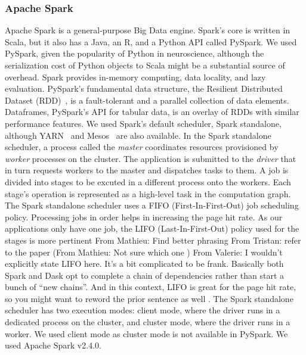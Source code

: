 \documentclass[conference]{IEEEtran}
\newcommand{\TG}[1]{\color{cyan}From Tristan: #1 \color{black}}
\newcommand{\MD}[1]{\color{magenta}From Mathieu: #1 \color{black}}
\newcommand{\VHS}[1]{\color{green}From Valerie: #1 \color{black}}
\begin{document}
\subsubsection{Apache Spark} Apache Spark is a general-purpose Big Data engine.
Spark's core is written in Scala, but it also has a Java, an R, and a Python API
called PySpark. We used PySpark, given the popularity of Python in neuroscience,
although the serialization cost of Python objects to Scala might be a substantial
source of overhead. Spark provides in-memory computing, data locality, and lazy
evaluation. PySpark's fundamental data structure, the Resilient Distributed Dataset
(RDD)~\cite{RDD}, is a fault-tolerant and a parallel collection of data elements.
Dataframes, PySpark's API for tabular data, is an overlay of RDDs with similar
performance features. We used Spark's default scheduler, Spark standalone, although
YARN~\cite{vavilapalli2013apache} and Mesos~\cite{hindman2011mesos} are also
available. In the Spark standalone scheduler, a process called the \emph{master}
coordinates resources provisioned by \emph{worker} processes on the cluster. The
application is submitted to the \emph{driver} that in turn requests workers to the
master and dispatches tasks to them. A job is divided into stages to be excuted in a
different process onto the workers. Each stage's operation is represented as a
high-level task in the computation graph. The Spark standalone scheduler uses a FIFO
(First-In-First-Out) job scheduling policy. Processing jobs in order helps in
increasing the page hit rate. As our applications only have one job, the LIFO
(Last-In-First-Out) policy used for the stages is more pertinent \MD{Find better
phrasing} \TG{refer to the paper (\MD{Not sure which one})} \VHS{I wouldn't
explicitly state LIFO here. It's a bit complicated to be frank. Basically both Spark
and Dask opt to complete a chain of dependencies rather than start a bunch of ``new
chains''. And in this context, LIFO is great for the page hit rate, so you might want
to reword the prior sentence as well}. The Spark standalone scheduler has two
execution modes: client mode, where the driver runs in a dedicated process on the
cluster, and cluster mode, where the driver runs in a worker. We used client mode as
cluster mode is not available in PySpark. We used Apache Spark v2.4.0.
\end{document}
